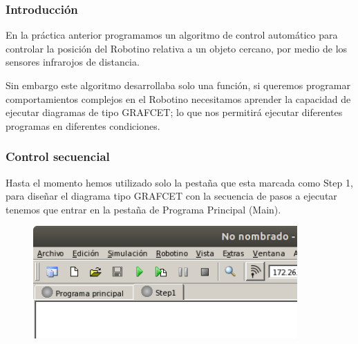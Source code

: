 \begin{frame}
	\frametitle{Introducción}
	En la práctica anterior programamos un algoritmo de control automático para controlar la posición del Robotino relativa a un objeto cercano, por medio de los sensores infrarojos de distancia.

	Sin embargo este algoritmo desarrollaba solo una función, si queremos programar comportamientos complejos en el Robotino necesitamos aprender la capacidad de ejecutar diagramas de tipo GRAFCET; lo que nos permitirá ejecutar diferentes programas en diferentes condiciones.
\end{frame}

\begin{frame}
	\frametitle{Control secuencial}
		Hasta el momento hemos utilizado solo la pestaña que esta marcada como Step 1, para diseñar el diagrama tipo GRAFCET con la secuencia de pasos a ejecutar tenemos que entrar en la pestaña de Programa Principal (Main).

		\begin{figure}
			\begin{center}
				\includegraphics[width=0.9\textwidth]{images/00-control-multiple/00.png}
				\label{fig:multiple-00}
			\end{center}
		\end{figure}
\end{frame}

